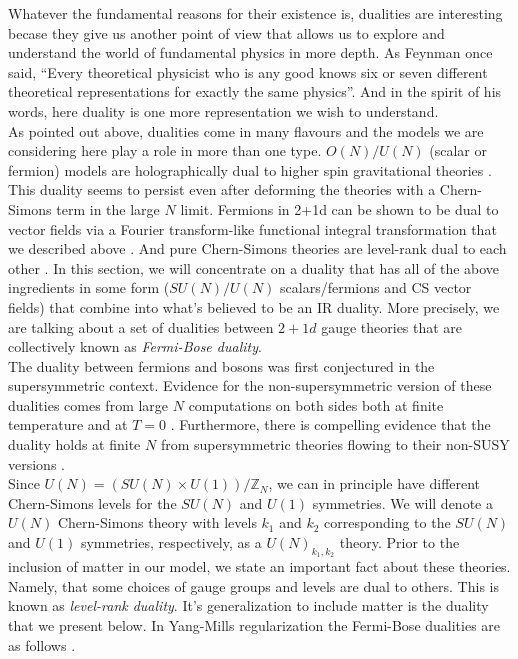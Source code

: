         Whatever the fundamental reasons for their existence is, dualities are interesting becase they give us another point of view that allows us to explore and understand the world of fundamental physics in more depth. As Feynman once said, ``Every theoretical physicist who is any good knows six or seven different theoretical representations for exactly the same physics''\cite{Feynman_quote}. And in the spirit of his words, here duality is one more representation we wish to understand.\\
        \indent As pointed out above, dualities come in many flavours and the models we are considering here play a role in more than one type. $O(N)/U(N)$ (scalar or fermion) models are holographically dual to higher spin gravitational theories \cite{hep-th/0210114}. This duality seems to persist even after deforming the theories with a Chern-Simons term in the large $N$ limit\cite{1110.4382}. Fermions in 2+1d can be shown to be dual to vector fields via a Fourier transform-like functional integral transformation that we described above \cite{hep-th/9401105, Barci1996}. And pure Chern-Simons theories are level-rank dual to each other \cite{Naculich1990, Camperi1990, Mlawer1991, Nakanishi1992, hep-th/0703089}. In this section, we will concentrate on a duality that has all of the above ingredients in some form ($SU(N)/U(N)$ scalars/fermions and CS vector fields) that combine into what's believed to be an IR duality. More precisely, we are talking about a set of dualities between $2+1d$ gauge theories that are collectively known as \textit{Fermi-Bose duality}.\\
        \indent The duality between fermions and bosons was first conjectured  in the supersymmetric context\cite{0808.0360, 1108.5373, 1305.3924, 1411.5475}. Evidence for the non-supersymmetric version of these dualities comes from large $N$ computations on both sides both at finite temperature \cite{1211.4843}  and at $T=0$ \cite{1110.4386}. Furthermore, there is compelling evidence that the duality holds at finite $N$ from supersymmetric theories flowing to their non-SUSY versions \cite{1305.7235, 1507.04378}.\\
        \indent Since $U(N) = (SU(N)\times U(1))/\mathbb{Z}_N$, we can in principle have different Chern-Simons levels for the $SU(N)$ and $U(1)$ symmetries. We will denote a $U(N)$ Chern-Simons theory with levels $k_1$ and $k_2$ corresponding to the $SU(N)$ and $U(1)$ symmetries, respectively, as a $U(N)_{k_1,k_2}$ theory. Prior to the inclusion of matter in our model, we state an important fact about these theories. Namely, that some choices of gauge groups and levels are dual to others. This is known as \textit{level-rank duality}. It's generalization to include matter is the duality that we present below. In Yang-Mills regularization the Fermi-Bose dualities are as follows \cite{1512.00161}.
